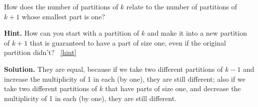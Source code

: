 \documentclass{book}
\begin{document}
\setcounter{project}{213}
\addtocounter{project}{-1}
\begin{activity}[]\label{activity-206}
\hypertarget{p-1151}{}%
How does the number of partitions of \(k\) relate to the number of partitions of \(k+1\) whose smallest part is one?%
\par\smallskip%
\noindent\textbf{Hint.}\hypertarget{hint-133}{}\quad%
\hypertarget{p-1152}{}%
How can you start with a partition of \(k\) and make it into a new partition of \(k+1\) that is guaranteed to have a part of size one, even if the original partition didn't?%
~\hfill{\tiny\hyperlink{a-213}{[hint]}\hypertarget{q-213}{}}\par\smallskip%
\noindent\textbf{Solution.}\hypertarget{solution-104}{}\quad%
\hypertarget{p-1153}{}%
They are equal, because if we take two different partitions of \(k-1\) and increase the multiplicity of 1 in each (by one), they are still different; also if we take two different partitions of \(k\) that have parts of size one, and decrease the multiplicity of 1 in each (by one), they are still different.%
\end{activity}

\clearpage
\end{document}
